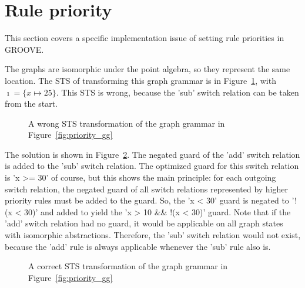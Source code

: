 \section{Rule priority}
This section covers a specific implementation issue of setting rule priorities in GROOVE.

The graphs are isomorphic under the point algebra, so they represent the same location. The STS of transforming this graph grammar is in Figure~\ref{fig:priority_sts_wrong}, with $\imath = \{x \mapsto 25\}$. This STS is wrong, because the 'sub' switch relation can be taken from the start.

\begin{figure}[ht]
  \begin{center}
    
  \end{center}
  \caption{A wrong STS transformation of the graph grammar in Figure~\ref{fig:priority_gg}}
  \label{fig:priority_sts_wrong}
\end{figure}

The solution is shown in Figure~\ref{fig:priority_sts_right}. The negated guard of the 'add' switch relation is added to the 'sub' switch relation. The optimized guard for this switch relation is 'x >= 30' of course, but this shows the main principle: for each outgoing switch relation, the negated guard of all switch relations represented by higher priority rules must be added to the guard. So, the 'x < 30' guard is negated to '!(x < 30)' and added to yield the 'x > 10 \&\& !(x < 30)' guard. Note that if the 'add' switch relation had no guard, it would be applicable on all graph states with isomorphic abstractions. Therefore, the 'sub' switch relation would not exist, because the 'add' rule is always applicable whenever the 'sub' rule also is.

\begin{figure}[ht]
  \begin{center}
    
  \end{center}
  \caption{A correct STS transformation of the graph grammar in Figure~\ref{fig:priority_gg}}
  \label{fig:priority_sts_right}
\end{figure}

